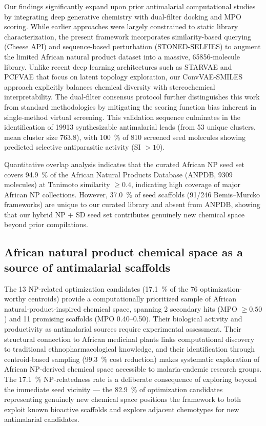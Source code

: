 \documentclass[journal=jcisd8,manuscript=article]{achemso}
\begin{document}
Our findings significantly expand upon prior antimalarial computational studies \cite{NtieKang2018, Simoben2020} by integrating deep generative chemistry with
dual-filter docking and MPO scoring. While earlier approaches were largely constrained to static library characterization, the present framework incorporates
similarity-based querying (Cheese API) and sequence-based perturbation (STONED-SELFIES) to augment the limited African natural product dataset into a massive,
\num{65856}-molecule library. Unlike recent deep learning architectures such as STARVAE \cite{Kwon2025} and PCFVAE \cite{Bhadwal2025} that focus on latent
topology exploration, our ConvVAE-SMILES approach explicitly balances chemical diversity with stereochemical interpretability. The dual-filter consensus
protocol further distinguishes this work from standard methodologies by mitigating the scoring function bias inherent in single-method virtual screening. This
validation sequence culminates in the identification of \num{19913} synthesizable antimalarial leads (from \num{53} unique clusters, mean cluster size
\num{763.8}), with \qty{100}{\percent} of \num{810} screened seed molecules showing predicted selective antiparasitic activity (SI $> \num{10}$).

Quantitative overlap analysis indicates that the curated African NP seed set covers \qty{94.9}{\percent} of the African Natural Products Database (ANPDB,
\num{9309} molecules) at Tanimoto similarity $\geq \num{0.4}$, indicating high coverage of major African NP collections. However, \qty{37.0}{\percent} of seed
scaffolds (\num{91}/\num{246} Bemis--Murcko frameworks) are unique to our curated library and absent from ANPDB, showing that our hybrid NP + SD seed set
contributes genuinely new chemical space beyond prior compilations.


\subsection*{African natural product chemical space as a source of antimalarial scaffolds}

The \num{13} NP-related optimization candidates (\qty{17.1}{\percent} of the \num{76} optimization-worthy centroids) provide a computationally prioritized sample of African natural-product-inspired chemical space, spanning \num{2} secondary hits (MPO $\geq \num{0.50}$) and \num{11} promising scaffolds (MPO
\numrange{0.40}{0.50}). Their biological activity and productivity as antimalarial sources require experimental assessment. Their structural connection to African medicinal plants links computational discovery to traditional ethnopharmacological knowledge,
and their identification through centroid-based sampling (\qty{99.3}{\percent} cost reduction) makes systematic exploration of African NP-derived chemical
space accessible to malaria-endemic research groups. The \qty{17.1}{\percent} NP-relatedness rate is a deliberate consequence of exploring beyond the immediate
seed vicinity — the \qty{82.9}{\percent} of optimization candidates representing genuinely new chemical space positions the framework to both exploit known
bioactive scaffolds and explore adjacent chemotypes for new antimalarial candidates.
\end{document}
